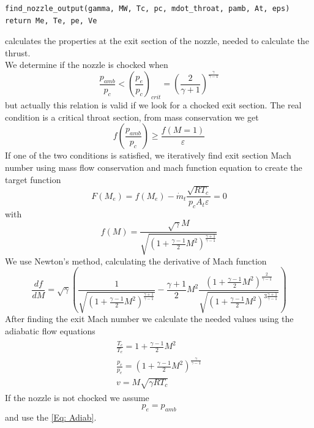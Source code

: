\begin{verbatim}
find_nozzle_output(gamma, MW, Tc, pc, mdot_throat, pamb, At, eps)
return Me, Te, pe, Ve
\end{verbatim}
\hspace*{2em} calculates the properties at the exit section of the nozzle, needed to calculate the thrust.\\
We determine if the nozzle is chocked when
\begin{equation}
    \frac{p_{amb}}{p_c}<(\frac{p_e}{p_c})_{crit}=(\frac{2}{\gamma+1})^{\frac{\gamma}{\gamma-1}}
\end{equation}
but actually this relation is valid if we look for a chocked exit section. The real condition is a critical throat section, from mass conservation we get
\begin{equation}
    f(\frac{p_{amb}}{p_c})\geq \frac{f(M=1)}{\varepsilon}
\end{equation}
If one of the two conditions is satisfied, we iteratively find exit section Mach number using mass flow conservation and mach function equation to create the target function
\begin{equation}
    F(M_e)= f(M_e) - \dot{m}_{t} \frac{\sqrt{RT_c}}{p_cA_t\varepsilon}=0
\end{equation}
with
\begin{equation*}
    f(M)= \frac{\sqrt{\gamma}M}{\sqrt{(1+\frac{\gamma-1}{2}M^2)^{\frac{\gamma+1}{\gamma-1}}}}
\end{equation*}
We use Newton's method, calculating the derivative of Mach function
\begin{equation}
    \frac{df}{dM}=\sqrt{\gamma}(\frac{1}{\sqrt{(1+\frac{\gamma-1}{2}M^2)^{\frac{\gamma+1}{\gamma-1}}}} -\frac{\gamma+1}{2}M^2 \frac{(1+\frac{\gamma-1}{2}M^2)^{\frac{2}{\gamma-1}}}{\sqrt{(1+\frac{\gamma-1}{2}M^2)^{3\frac{\gamma+1}{\gamma-1}}}})
\end{equation}
After finding the exit Mach number we calculate the needed values using the adiabatic flow equations
\begin{gather}
    \begin{matrix}
        \frac{T_c}{T_e}=1+\frac{\gamma-1}{2}M^2\\
        \frac{p_c}{p_e}=(1+\frac{\gamma-1}{2}M^2)^{\frac{\gamma}{\gamma-1}}\\
        v=M\sqrt{\gamma RT_c}
    \end{matrix}
    \label{Eq: Adiab}
\end{gather}
If the nozzle is not chocked we assume
\begin{equation}
    p_e=p_{amb}
\end{equation}
and use the \ref{Eq: Adiab}.


